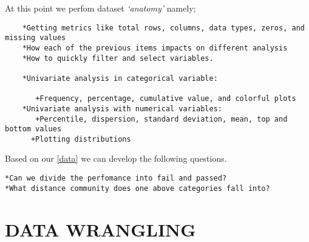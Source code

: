 \documentclass[
]{book}
\newenvironment{Shaded}{\begin{snugshade}}{\end{snugshade}}
\newcommand{\AttributeTok}[1]{\textcolor[rgb]{0.77,0.63,0.00}{#1}}
\newcommand{\CommentTok}[1]{\textcolor[rgb]{0.56,0.35,0.01}{\textit{#1}}}
\newcommand{\DecValTok}[1]{\textcolor[rgb]{0.00,0.00,0.81}{#1}}
\newcommand{\FunctionTok}[1]{\textcolor[rgb]{0.00,0.00,0.00}{#1}}
\newcommand{\NormalTok}[1]{#1}
\newcommand{\OtherTok}[1]{\textcolor[rgb]{0.56,0.35,0.01}{#1}}
\newcommand{\SpecialCharTok}[1]{\textcolor[rgb]{0.00,0.00,0.00}{#1}}
\newcommand{\StringTok}[1]{\textcolor[rgb]{0.31,0.60,0.02}{#1}}
\begin{document}
At this point we perfom dataset \emph{`anatomy'} namely;

\begin{verbatim}
    *Getting metrics like total rows, columns, data types, zeros, and missing values
    *How each of the previous items impacts on different analysis
    *How to quickly filter and select variables.
    
    *Univariate analysis in categorical variable:
       
       +Frequency, percentage, cumulative value, and colorful plots
    *Univariate analysis with numerical variables:
       +Percentile, dispersion, standard deviation, mean, top and bottom values
      +Plotting distributions
\end{verbatim}

Based on our \ref{data} we can develop the following questions.

\begin{verbatim}
*Can we divide the perfomance into fail and passed?
*What distance community does one above categories fall into?
\end{verbatim}

\hypertarget{dw}{%
\section{DATA WRANGLING}\label{dw}}

\begin{Shaded}
\end{Shaded}
\end{document}

